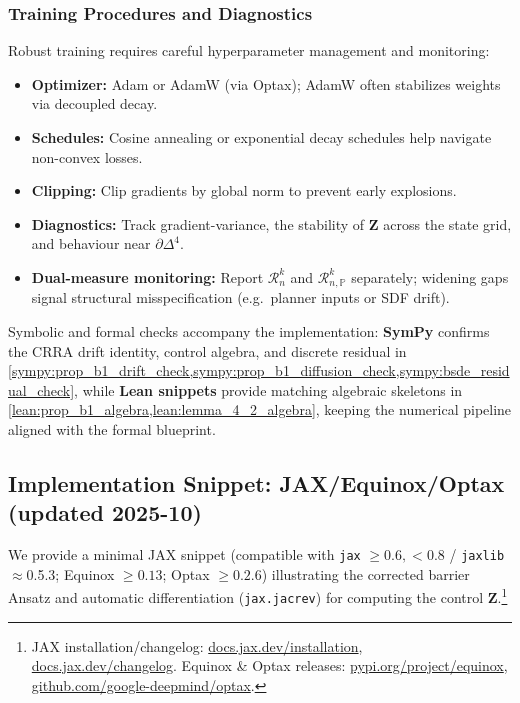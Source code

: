 \documentclass[11pt,letterpaper,oneside]{article}
\numberwithin{equation}{section}
\newcommand{\1}{\mathbf{1}}
\begin{document}
\subsubsection{Training Procedures and Diagnostics}
Robust training requires careful hyperparameter management and monitoring:
\begin{itemize}[leftmargin=1.25em]
  \item \textbf{Optimizer:} Adam or AdamW (via Optax); AdamW often stabilizes weights via decoupled decay.
  \item \textbf{Schedules:} Cosine annealing or exponential decay schedules help navigate non-convex losses.
  \item \textbf{Clipping:} Clip gradients by global norm to prevent early explosions.
  \item \textbf{Diagnostics:} Track gradient-variance, the stability of $\bm{Z}$ across the state grid, and behaviour near $\partial\Delta^4$.
  \item \textbf{Dual-measure monitoring:} Report $\mathcal{R}_{n}^{k}$ and $\mathcal{R}_{n,\mathbb{P}}^{k}$ separately; widening gaps signal structural misspecification (e.g.\ planner inputs or SDF drift).
\end{itemize}
\begin{tcolorbox}[mathstyle,title={Verification hooks}]
  Symbolic and formal checks accompany the implementation: \textbf{SymPy} confirms the CRRA drift identity, control algebra, and discrete residual in \cref{sympy:prop_b1_drift_check,sympy:prop_b1_diffusion_check,sympy:bsde_residual_check}, while \textbf{Lean snippets} provide matching algebraic skeletons in \cref{lean:prop_b1_algebra,lean:lemma_4_2_algebra}, keeping the numerical pipeline aligned with the formal blueprint.
\end{tcolorbox}

\subsection{Implementation Snippet: JAX/Equinox/Optax (updated 2025-10)}\label{sec:computation:jax_snippet}

We provide a minimal JAX snippet (compatible with \texttt{jax} $\ge 0.6,<0.8$ / \texttt{jaxlib}$\approx$0.5.3; Equinox $\ge 0.13$; Optax $\ge 0.2.6$) illustrating the corrected barrier Ansatz and automatic differentiation (\texttt{jax.jacrev}) for computing the control $\bm{Z}$.\footnote{JAX installation/changelog: \href{https://docs.jax.dev/en/latest/installation.html}{docs.jax.dev/installation}, \href{https://docs.jax.dev/en/latest/changelog.html}{docs.jax.dev/changelog}. Equinox \& Optax releases: \href{https://pypi.org/project/equinox/}{pypi.org/project/equinox}, \href{https://github.com/google-deepmind/optax}{github.com/google-deepmind/optax}.}
\end{document}
